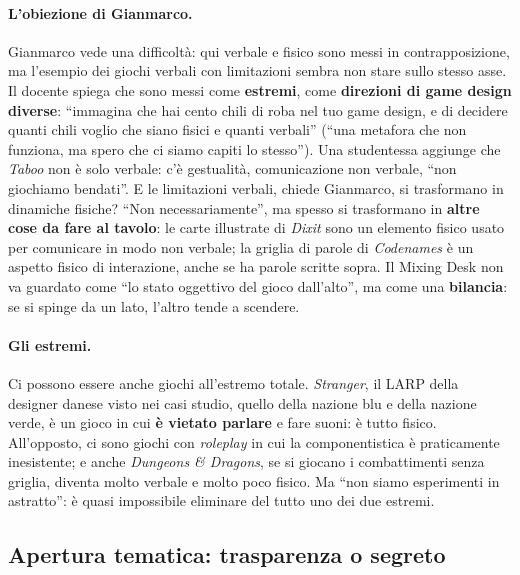 \paragraph{L'obiezione di Gianmarco.} Gianmarco vede una difficoltà: qui verbale e
fisico sono messi in contrapposizione, ma l'esempio dei giochi verbali con
limitazioni sembra non stare sullo stesso asse. Il docente spiega che sono
messi come \textbf{estremi}, come \textbf{direzioni di game design diverse}:
``immagina che hai cento chili di roba nel tuo game design, e di decidere quanti
chili voglio che siano fisici e quanti verbali'' (``una metafora che non
funziona, ma spero che ci siamo capiti lo stesso''). Una studentessa aggiunge
che \emph{Taboo} non è solo verbale: c'è gestualità, comunicazione non verbale,
``non giochiamo bendati''. E le limitazioni verbali, chiede Gianmarco, si
trasformano in dinamiche fisiche? ``Non necessariamente'', ma spesso si
trasformano in \textbf{altre cose da fare al tavolo}: le carte illustrate di
\emph{Dixit} sono un elemento fisico usato per comunicare in modo non verbale;
la griglia di parole di \emph{Codenames} è un aspetto fisico di interazione,
anche se ha parole scritte sopra. Il Mixing Desk non va guardato come ``lo stato
oggettivo del gioco dall'alto'', ma come una \textbf{bilancia}: se si spinge da
un lato, l'altro tende a scendere.

\paragraph{Gli estremi.} Ci possono essere anche giochi all'estremo totale.
\emph{Stranger}, il LARP della designer danese visto nei casi studio, quello
della nazione blu e della nazione verde, è un gioco in cui \textbf{è vietato
parlare} e fare suoni: è tutto fisico. All'opposto, ci sono giochi con
\emph{roleplay} in cui la componentistica è praticamente inesistente; e anche
\emph{Dungeons \& Dragons}, se si giocano i combattimenti senza griglia, diventa
molto verbale e molto poco fisico. Ma ``non siamo esperimenti in astratto'': è
quasi impossibile eliminare del tutto uno dei due estremi.

\subsection{Apertura tematica: trasparenza o segreto}
\label{a3:sec:apertura}

